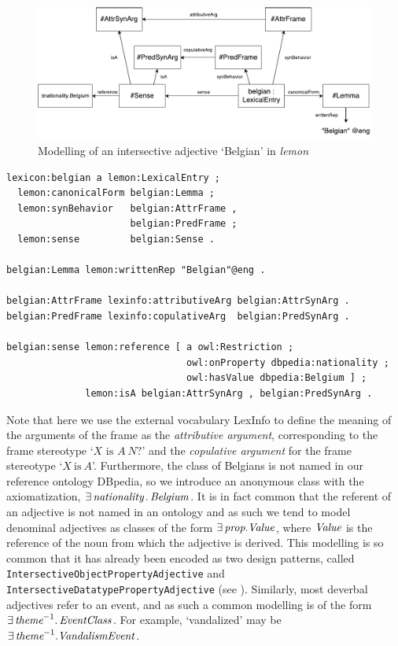 \documentclass[11pt]{article}
\begin{document}
\begin{figure}
\includegraphics[width=\textwidth]{belgian-example}
\caption{Modelling of an intersective adjective `Belgian' in \emph{lemon}\label{example-belgian}}
\end{figure}

\begin{small}\begin{verbatim}
lexicon:belgian a lemon:LexicalEntry ;
  lemon:canonicalForm belgian:Lemma ;
  lemon:synBehavior   belgian:AttrFrame , 
                      belgian:PredFrame ;
  lemon:sense         belgian:Sense .

belgian:Lemma lemon:writtenRep "Belgian"@eng .

belgian:AttrFrame lexinfo:attributiveArg belgian:AttrSynArg .
belgian:PredFrame lexinfo:copulativeArg  belgian:PredSynArg .

belgian:sense lemon:reference [ a owl:Restriction ;
                                owl:onProperty dbpedia:nationality ;
                                owl:hasValue dbpedia:Belgium ] ;
              lemon:isA belgian:AttrSynArg , belgian:PredSynArg .
\end{verbatim}\end{small}

Note that here we use the external vocabulary LexInfo \cite{cimiano2011lexinfo} 
to define the meaning of the arguments of the frame as the \emph{attributive 
argument}, corresponding to the frame stereotype `$X\text{ is }A~N?$' and the 
\emph{copulative argument} for the frame stereotype `$X\mathrm{~is~}A$'. Furthermore,
the class of Belgians is not named in our reference ontology DBpedia, so we 
introduce an anonymous class with the axiomatization, 
$\exists\,\text{\em nationality}\,.\,\text{\em Belgium}$. It is in fact common that the 
referent of an adjective is not named in an ontology and as such we tend to 
model denominal adjectives as classes of the form $\exists\,\text{\em prop}.\text{\em Value}$, 
where $\text{\em Value}$ is the reference of the noun from which the adjective is
derived. This modelling is so common that it has already been encoded as two
design patterns, called {\tt IntersectiveObjectPropertyAdjective} and {\tt
IntersectiveDatatypePropertyAdjective} (see \cite{mccrae2014design}).
Similarly, most deverbal adjectives refer to an event, and as such
a common modelling is of the form $\exists\,\text{\em theme}^{-1}. \,\text{\em EventClass}$.
For example, `vandalized' may be $\exists\,\text{\em theme}^{-1}.\text{\em VandalismEvent}$.
\end{document}
